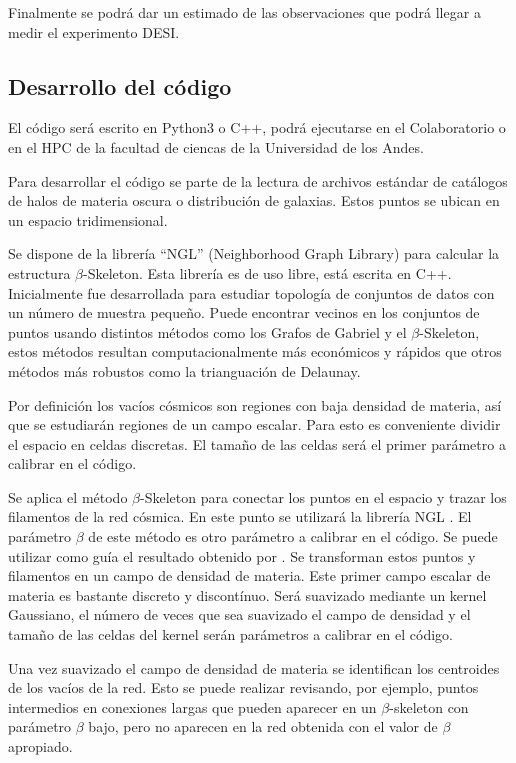 \documentclass[preprint]{aastex62}
\begin{document}
  Finalmente se podrá dar un estimado de las observaciones que podrá llegar a medir el
  experimento DESI.

  \subsection{Desarrollo del código}

  El código será escrito en Python3 o C++, podrá ejecutarse en el Colaboratorio o en el HPC de la
  facultad de ciencas de la Universidad de los Andes.
  
  Para desarrollar el código se parte de la lectura de archivos estándar de catálogos de halos
  de materia oscura o distribución de galaxias. Estos puntos se ubican en un espacio tridimensional.

  Se dispone de la librería ``NGL''\citep{ngl} (Neighborhood Graph Library)
  para calcular la estructura $\beta$-Skeleton. Esta librería es de uso libre, está escrita en C++.
  Inicialmente fue desarrollada para estudiar topología de conjuntos de datos con un número de muestra
  pequeño. Puede encontrar vecinos en los conjuntos de puntos usando distintos métodos como los
  Grafos de Gabriel y el $\beta$-Skeleton, estos métodos resultan computacionalmente más económicos
  y rápidos que otros métodos más robustos como la trianguación de Delaunay.
  
  Por definición los vacíos cósmicos son regiones con baja densidad de materia, así que se
  estudiarán regiones de un campo escalar. Para esto es conveniente dividir el espacio en
  celdas discretas. El tamaño de las celdas será el primer parámetro a calibrar en el código.
  
  Se aplica el método $\beta$-Skeleton para conectar los puntos en el espacio y trazar los
  filamentos de la red cósmica. En este punto se utilizará la librería NGL \citep{ngl}.
  El parámetro $\beta$ de este método es otro parámetro a calibrar en el código. Se puede
  utilizar como guía el resultado obtenido por \citet{Fang2018}.
  Se transforman estos puntos y filamentos en un campo de densidad de materia. Este primer
  campo escalar de materia es bastante discreto y discontínuo. Será suavizado mediante un
  kernel Gaussiano, el número de veces que sea suavizado el campo de densidad y el tamaño de
  las celdas del kernel serán parámetros a calibrar en el código.

  Una vez suavizado el campo de densidad de materia se identifican los centroides
  de los vacíos de la red. Esto se puede realizar revisando, por ejemplo, puntos intermedios
  en conexiones largas que pueden aparecer en un $\beta$-skeleton con parámetro $\beta$ bajo,
  pero no aparecen en la red obtenida con el valor de $\beta$ apropiado.
\end{document}
